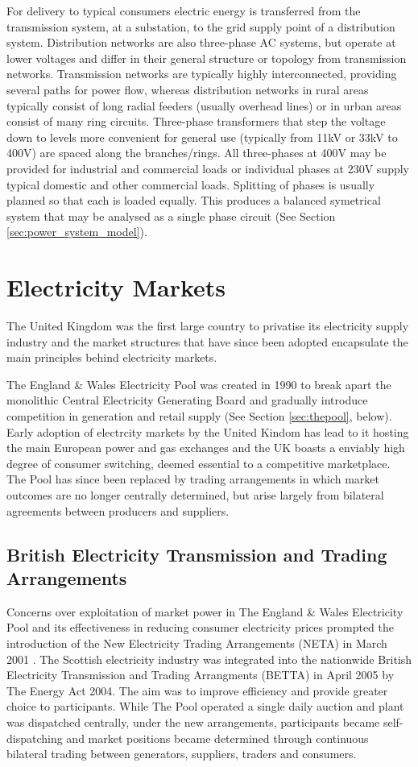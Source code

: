 For delivery to typical consumers electric energy is transferred from the
transmission system, at a substation, to the grid supply point of a
distribution system.  Distribution networks are also three-phase AC systems,
but operate at lower voltages and differ in their general structure or topology
from transmission networks.  Transmission networks are typically highly
interconnected, providing several paths for power flow, whereas distribution
networks in rural areas typically consist of long radial feeders (usually
overhead lines) or in urban areas consist of many ring circuits.  Three-phase
transformers that step the voltage down to levels more convenient for general
use (typically from 11kV or 33kV to 400V) are spaced along the branches/rings.
All three-phases at 400V may be provided for industrial and commercial loads or
individual phases at 230V supply typical domestic and other commercial loads.
Splitting of phases is usually planned so that each is loaded equally.  This
produces a balanced symetrical system that may be analysed as a single phase
circuit (See Section \ref{sec:power_system_model}).

\section{Electricity Markets}
The United Kingdom was the first large country to privatise its electricity
supply industry and the market structures that have since been adopted
encapsulate the main principles behind electricity markets.

The England \& Wales Electricity Pool was created in 1990 to break apart the
monolithic Central Electricity Generating Board and gradually introduce
competition in generation and retail supply (See Section \ref{sec:thepool},
below).  Early adoption of electrcity markets by the United Kindom has lead to
it hosting the main European power and gas exchanges and the UK boasts a
enviably high degree of consumer switching, deemed essential to a competitive
marketplace.  The Pool has since been replaced by trading arrangements in which
market outcomes are no longer centrally determined, but arise largely from
bilateral agreements between producers and suppliers.

\subsection{British Electricity Transmission and Trading Arrangements}
\label{sec:betta}
Concerns over exploitation of market power in The England \& Wales Electricity
Pool and its effectiveness in reducing consumer electricity prices prompted the
introduction of the New Electricity Trading Arrangements (NETA) in March 2001
\cite{martoccia:2005}.  The Scottish electricity industry was integrated into
the nationwide British Electricity Transmission and Trading Arrangments (BETTA)
in April 2005 by The Energy Act 2004.  The aim was to improve efficiency and
provide greater choice to participants.  While The Pool operated a single daily
auction and plant was dispatched centrally, under the new arrangements,
participants became self-dispatching and market positions became determined
through continuous bilateral trading between generators, suppliers, traders and
consumers.

